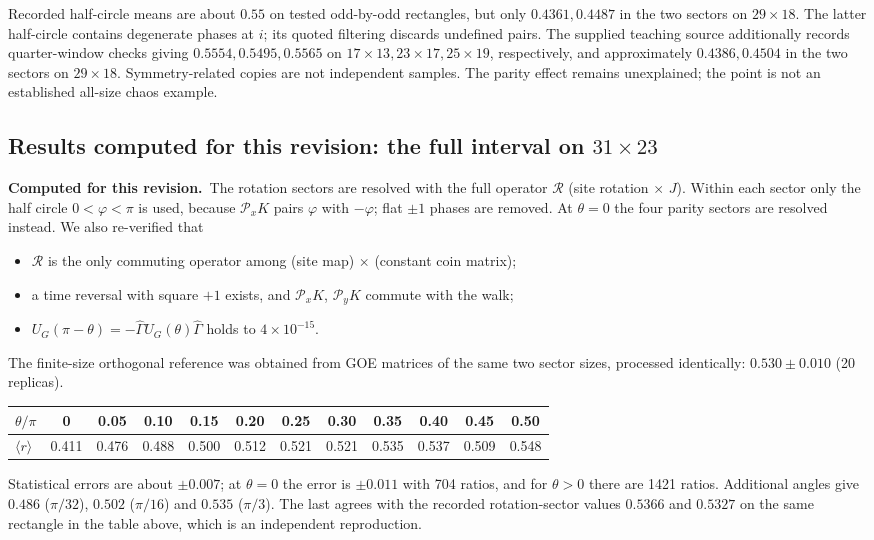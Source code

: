 \documentclass[11pt,a4paper,oneside]{report}
\newcommand{\session}{\textbf{Computed for this revision.}\ }
\numberwithin{equation}{chapter}
\begin{document}
Recorded half-circle means are about \(0.55\) on tested odd-by-odd
rectangles, but only \(0.4361,0.4487\) in the two sectors on
\(29\times18\). The latter half-circle contains degenerate phases
at \(i\); its quoted filtering discards undefined pairs. The supplied teaching source additionally records quarter-window checks giving
\(0.5554,0.5495,0.5565\) on \(17\times13,23\times17,25\times19\),
respectively, and approximately \(0.4386,0.4504\) in the two sectors
on \(29\times18\). Symmetry-related copies are not independent
samples. The parity effect remains unexplained; the point is not an
established all-size chaos example.


\subsection{Results computed for this revision: the full interval on \(31\times23\)}

\session The rotation sectors are resolved with the full operator
\(\mathcal R\) (site rotation \(\times\) \(J\)). Within each sector only
the half circle \(0<\varphi<\pi\) is used, because \(\mathcal P_xK\)
pairs \(\varphi\) with \(-\varphi\); flat \(\pm1\) phases are removed.
At \(\theta=0\) the four parity sectors are resolved instead. We also re-verified that
\begin{itemize}
\item \(\mathcal R\) is the only commuting operator among (site map)
\(\times\) (constant coin matrix);
\item a time reversal with square \(+1\) exists, and \(\mathcal P_xK\),
\(\mathcal P_yK\) commute with the walk;
\item \(U_G(\pi-\theta)=-\widehat\Gamma U_G(\theta)\widehat\Gamma\) holds
to \(4\times10^{-15}\).
\end{itemize}
The finite-size orthogonal reference was obtained from GOE matrices of
the same two sector sizes, processed identically: \(0.530\pm0.010\)
(20 replicas).
\begin{center}\small
\begin{tabular}{@{}lccccccccccc@{}}\toprule
\(\theta/\pi\)&0&0.05&0.10&0.15&0.20&0.25&0.30&0.35&0.40&0.45&0.50\\\midrule
\(\langle r\rangle\)&0.411&0.476&0.488&0.500&0.512&0.521&0.521&0.535&0.537&0.509&0.548\\\bottomrule
\end{tabular}
\end{center}
Statistical errors are about \(\pm0.007\); at \(\theta=0\) the error is
\(\pm0.011\) with 704 ratios, and for \(\theta>0\) there are 1421 ratios.
Additional angles give \(0.486\) (\(\pi/32\)), \(0.502\) (\(\pi/16\)) and
\(0.535\) (\(\pi/3\)). The last agrees with the recorded rotation-sector
values \(0.5366\) and \(0.5327\) on the same rectangle in the table above,
which is an independent reproduction.
\end{document}
